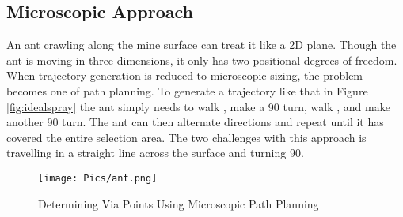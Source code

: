 \subsection{Microscopic Approach}

An ant crawling along the mine surface can treat it like a 2D plane. Though the ant is moving in three dimensions, it only has two positional degrees of freedom. When trajectory generation is reduced to microscopic sizing, the problem becomes one of path planning. To generate a trajectory like that in Figure \ref{fig:idealspray} the ant simply needs to walk , make a 90\degree\hspace{0pt} turn, walk , and make another 90\degree\hspace{0pt} turn. The ant can then alternate directions and repeat until it has covered the entire selection area. The two challenges with this approach is travelling in a straight line across the surface and turning 90\degree\hspace{0pt}.\\


\begin{figure}[h!]
    \centering
    \texttt{[image: Pics/ant.png]}
    \caption{Determining Via Points Using Microscopic Path Planning}
    \label{fig:ant}
\end{figure}


